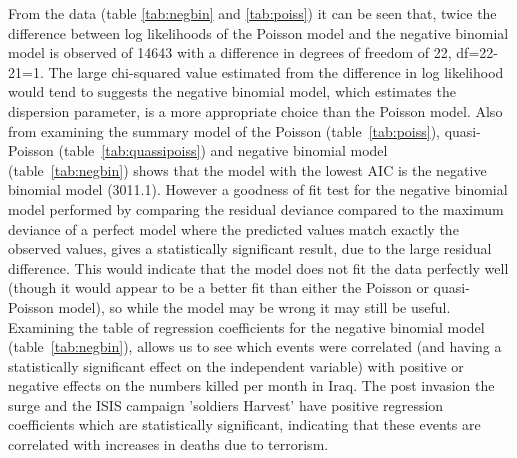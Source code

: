 From the data (table \ref{tab:negbin} and \ref{tab:poiss}) it can be seen that, twice the difference between log likelihoods of the  Poisson model and the negative binomial model is observed of 14643 with a difference in degrees of freedom of 22, df=22-21=1. The large chi-squared value estimated from the difference in log likelihood would tend to suggests the negative binomial model, which estimates the dispersion parameter, is a more appropriate choice than the Poisson model. Also from examining the summary model of the Poisson (table~\ref{tab:poiss}), quasi-Poisson (table~\ref{tab:quassipoiss}) and negative binomial model (table~\ref{tab:negbin}) shows that the model with the lowest AIC is the negative binomial model (3011.1). However a goodness of fit test for the negative binomial model performed by comparing the residual deviance compared to the maximum deviance of a perfect model where the predicted values match exactly the observed values, gives a statistically significant result, due to the large residual difference. This would indicate that the model does not fit the data perfectly well (though it would appear to be a better fit than either the Poisson or quasi-Poisson model), so while the model may be wrong it may still be useful. Examining the table of regression coefficients for the negative binomial model (table~\ref{tab:negbin}), allows us to see which events were correlated (and having a statistically significant effect on the independent variable) with positive or negative effects on the numbers killed per month in Iraq. The post invasion the surge and the ISIS campaign 'soldiers Harvest' have positive regression coefficients which are statistically significant, indicating that these events are correlated with  increases in deaths due to terrorism.  

